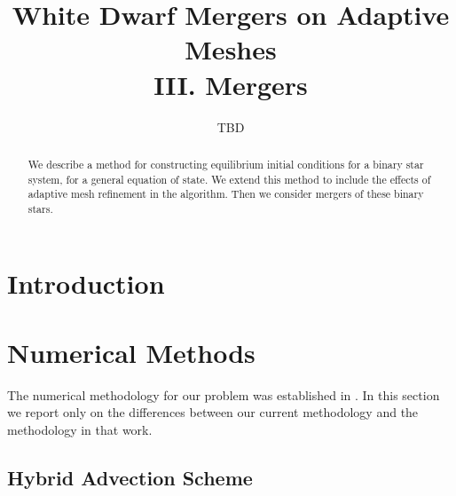 \documentclass[twocolumn,numberedappendix]{../aastex6}
\begin{document}
\title{White Dwarf Mergers on Adaptive Meshes\\ III. Mergers}


\author{TBD}
\begin{abstract}
We describe a method for constructing equilibrium initial conditions for a binary star system,
for a general equation of state. We extend this method to include the effects of adaptive
mesh refinement in the algorithm. Then we consider mergers of these binary stars.

\end{abstract}

\section{Introduction}




\section{Numerical Methods}
\label{sec:methodology}

The numerical methodology for our problem was established in \cite{wdmergerI}.
In this section we report only on the differences between our current methodology
and the methodology in that work.

\subsection{Hybrid Advection Scheme}
\label{sec:hybrid}
\end{document}
